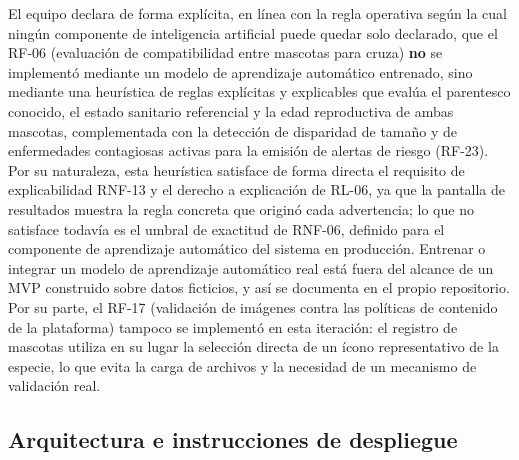\documentclass[journal,onecolumn]{IEEEtran}
\begin{document}
	El equipo declara de forma explícita, en línea con la regla operativa según
	la cual ningún componente de inteligencia artificial puede quedar solo
	declarado, que el RF-06 (evaluación de compatibilidad entre mascotas para
	cruza) \textbf{no} se implementó mediante un modelo de aprendizaje
	automático entrenado, sino mediante una heurística de reglas explícitas y
	explicables que evalúa el parentesco conocido, el estado sanitario
	referencial y la edad reproductiva de ambas mascotas, complementada con la
	detección de disparidad de tamaño y de enfermedades contagiosas activas
	para la emisión de alertas de riesgo (RF-23). Por su naturaleza, esta
	heurística satisface de forma directa el requisito de explicabilidad
	RNF-13 y el derecho a explicación de RL-06, ya que la pantalla de
	resultados muestra la regla concreta que originó cada advertencia; lo que
	no satisface todavía es el umbral de exactitud de RNF-06, definido para el
	componente de aprendizaje automático del sistema en producción. Entrenar o
	integrar un modelo de aprendizaje automático real está fuera del alcance de
	un MVP construido sobre datos ficticios, y así se documenta en el propio
	repositorio. Por su parte, el RF-17 (validación de imágenes contra las
	políticas de contenido de la plataforma) tampoco se implementó en esta
	iteración: el registro de mascotas utiliza en su lugar la selección directa
	de un ícono representativo de la especie, lo que evita la carga de archivos
	y la necesidad de un mecanismo de validación real.
	
	\subsection{Arquitectura e instrucciones de despliegue}
	\label{sec:mvp-arquitectura}
	
\end{document}
